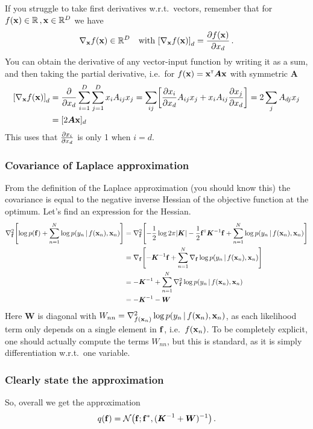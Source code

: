 \documentclass[a4paper]{article}
\newcommand{\mat}[1]{{\boldsymbol{{#1}}}} %
\theoremstyle{definition}
\begin{document}
If you struggle to take first derivatives w.r.t.~vectors, remember that for $f(\vx) \in \Reals\,, \vx\in\Reals^D$ we have
\begin{align}
\nabla_\vx f(\vx)\in \Reals^D \quad\text{with } \left[\nabla_\vx f(\vx)\right]_d = \pderiv[f(\vx)]{x_d} \,.
\end{align}
You can obtain the derivative of any vector-input function by writing it as a sum, and then taking the partial derivative, i.e.~for $f(\vx) = \vx\transpose \mat A\vx$ with symmetric $\mat A$
\begin{align}
\left[\nabla_\vx f(\vx)\right]_d &= \pderiv[]{x_d}\sum_{i=1}^D\sum_{j=1}^D x_{i} A_{ij} x_{j} = \sum_{ij} \left[ \pderiv[x_i]{x_d}A_{ij}x_j + x_iA_{ij}\pderiv[x_j]{x_d} \right] = 2 \sum_{j}A_{dj}x_j \nonumber \\
&= [2\mat A\vx]_d
\end{align}
This uses that $\pderiv[x_i]{x_d}$ is only 1 when $i=d$.

\subsubsection{Covariance of Laplace approximation}
From the definition of the Laplace approximation (you should know this) the covariance is equal to the negative inverse Hessian of the objective function at the optimum. Let's find an expression for the Hessian.
\begin{align}
\nabla_\vf^2 \left[\log p(\vf) + \sum_{n=1}^N \log p(y_n\given f(\vx_n), \vx_n)\right] &= \nabla_\vf^2 \left[-\frac{1}{2}\log 2\pi\detbar{\mat K} - \frac{1}{2}\vf\transpose\mat K\inv\vf + \sum_{n=1}^N \log p(y_n\given f(\vx_n), \vx_n)\right] \nonumber \\
&= \nabla_\vf\left[- \mat K\inv\vf + \sum_{n=1}^N\nabla_\vf \log p(y_n\given f(\vx_n), \vx_n)\right] \nonumber \\
&= -\mat K\inv + \sum_{n=1}^N \nabla_\vf^2\log p(y_n\given f(\vx_n), \vx_n) \nonumber \\
&= -\mat K\inv - \mat W \nonumber
\end{align}
Here $\mat W$ is diagonal with $W_{nn} = \nabla_{f(\vx_n)}^2\log p(y_n\given f(\vx_n), \vx_n)$, as each likelihood term only depends on a single element in $\vf$, i.e.~$f(\vx_n)$. To be completely explicit, one should actually compute the terms $W_{nn}$, but this is standard, as it is simply differentiation w.r.t.~one variable.

\subsubsection{Clearly state the approximation}
So, overall we get the approximation
\begin{align}
q(\vf) = \NormDist{\vf; \vf^*, (\mat K\inv + \mat W)\inv} \,.
\end{align}
\end{document}
